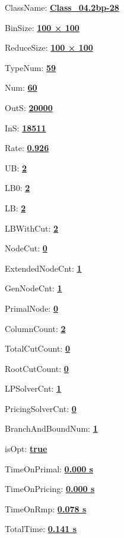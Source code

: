 \documentclass[11pt]{article}
\begin{document}
\pagestyle{empty}


ClassName: \underline{\textbf{Class_04.2bp-28}}
\par
BinSize: \underline{\textbf{100 × 100}}
\par
ReduceSize: \underline{\textbf{100 × 100}}
\par
TypeNum: \underline{\textbf{59}}
\par
Num: \underline{\textbf{60}}
\par
OutS: \underline{\textbf{20000}}
\par
InS: \underline{\textbf{18511}}
\par
Rate: \underline{\textbf{0.926}}
\par
UB: \underline{\textbf{2}}
\par
LB0: \underline{\textbf{2}}
\par
LB: \underline{\textbf{2}}
\par
LBWithCut: \underline{\textbf{2}}
\par
NodeCut: \underline{\textbf{0}}
\par
ExtendedNodeCnt: \underline{\textbf{1}}
\par
GenNodeCnt: \underline{\textbf{1}}
\par
PrimalNode: \underline{\textbf{0}}
\par
ColumnCount: \underline{\textbf{2}}
\par
TotalCutCount: \underline{\textbf{0}}
\par
RootCutCount: \underline{\textbf{0}}
\par
LPSolverCnt: \underline{\textbf{1}}
\par
PricingSolverCnt: \underline{\textbf{0}}
\par
BranchAndBoundNum: \underline{\textbf{1}}
\par
isOpt: \underline{\textbf{true}}
\par
TimeOnPrimal: \underline{\textbf{0.000 s}}
\par
TimeOnPricing: \underline{\textbf{0.000 s}}
\par
TimeOnRmp: \underline{\textbf{0.078 s}}
\par
TotalTime: \underline{\textbf{0.141 s}}
\par
\newpage
\end{document}
